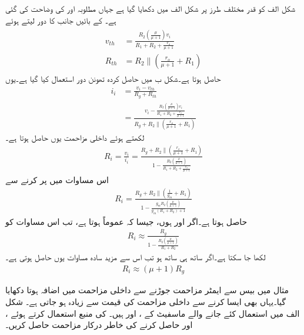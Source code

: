 شکل  الف کو قدر مختلف طرز پر  شکل  الف میں دکھایا گیا ہے جہاں مطلوبہ  اور  کی وضاحت کی گئی ہے۔ کے بائیں جانب کا  دور لیتے ہوئے
\begin{gather}
\begin{aligned}
v_{th}&=\frac{R_2 \left(\frac{\mu }{\mu+1} \right) v_i}{R_1+R_2+\frac{r_o}{\mu+1}}\\
R_{th}&=R_2 \mathbin{\|} \left(\frac{r_o}{\mu+1}+R_1 \right)
\end{aligned}
\end{gather}
حاصل ہوتا ہے۔شکل  ب میں حاصل کردہ تھونن دور استعمال کیا گیا ہے۔یوں
\begin{align*}
i_i&=\frac{v_i-v_{th}}{R_g+R_{th}}\\
&=\frac{v_i-\frac{R_2 \left(\frac{\mu }{\mu+1} \right) v_i}{R_1+R_2+\frac{r_o}{\mu+1}}}{R_g+R_2 \mathbin{\|} \left(\frac{r_o}{\mu+1}+R_1 \right)}
\end{align*}
لکھتے ہوئے داخلی مزاحمت  یوں حاصل ہوتا ہے۔
\begin{align}\label{مساوات_ماسفیٹ_تابع_مخارج_داخلی_مزاحمت_الف}
R_i=\frac{v_i}{i_i}=\frac{R_g+R_2 \mathbin{\|} \left(\frac{r_o}{\mu+1}+R_1 \right)}{1-\frac{R_2 \left(\frac{\mu }{\mu+1} \right)}{R_1+R_2+\frac{r_o}{\mu+1}}}
\end{align}
اس مساوات میں  پر کرنے سے
\begin{align}\label{مساوات_ماسفیٹ_تابع_مخارج_داخلی_مزاحمت_ب}
R_i=\frac{R_g+R_2 \mathbin{\|} \left(\frac{1}{g_m}+R_1 \right)}{1-\frac{g_m R_2 \left(\frac{\mu }{\mu+1} \right)}{g_m \left(R_1+R_2\right)+1}}
\end{align}
حاصل ہوتا ہے۔اگر  اور  ہوں، جیسا کہ عموماً ہوتا ہے، تب اس مساوات کو
\begin{align}\label{مساوات_ماسفیٹ_تابع_مخارج_داخلی_مزاحمت_پ}
R_i \approx \frac{R_g}{1-\frac{R_2 \left(\frac{\mu}{\mu+1} \right)}{R_1+R_2}}
\end{align}
لکھا جا سکتا ہے۔اگر ساتھ ہی ساتھ  ہو تب اس سے مزید سادہ مساوات یوں حاصل ہوتی ہے۔
\begin{align} \label{مساوات_ماسفیٹ_تابع_مخارج_داخلی_مزاحمت_ت}
R_i \approx \left(\mu+1 \right) R_g
\end{align}

مثال  میں  بیس سے ایمٹر مزاحمت جوڑنے سے داخلی مزاحمت میں اضافہ ہوتا دکھایا گیا۔یہاں بھی ایسا کرنے سے داخلی مزاحمت کی قیمت  سے زیادہ ہو جاتی ہے۔
شکل  الف میں استعمال کئے جانے والے ماسفیٹ کے
 ،  اور  ہیں۔ کی منبع استعمال کرتے ہوئے ،  اور  حاصل کرنے کی خاطر درکار مزاحمت حاصل کریں۔

